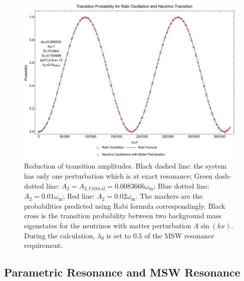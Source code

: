 \documentclass[%
preprint,
 amsmath,amssymb,
 aps,
]{revtex4-1}
\begin{document}

\begin{figure}[!htbp]
                \centering
                \includegraphics[width=\textwidth]{assets/rabiOscillationsNeutrinoCoincidence}
                \caption{Reduction of transition amplitudes. Black dashed line: the system has only one perturbation which is at exact resonance; Green dash-dotted line: $A_2=A_{2,\mathrm{Critical}}=0.0083666\omega_{\mathrm m}$; Blue dotted line: $A_2=0.01\omega_{\mathrm m}$; Red line: $A_2=0.02\omega_{\mathrm m}$. The markers are the probabilities predicted using Rabi formula correspondingly. Black cross is the transition probability between two background mass eigenstates for the neutrinos with matter perturbation $A\sin(kx)$. During the calculation, $\lambda_0$ is set to $0.5$ of the MSW resonance requirement.}
                \label{fig-rabiOscillationsNeutrinoCoincidence}
\end{figure}






\subsection{Parametric Resonance and MSW Resonance}
\end{document}
